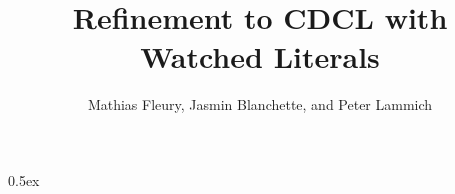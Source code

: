 \documentclass[11pt,a4paper]{book}
\begin{document}
\title{Refinement to CDCL with Watched Literals}
\author{Mathias Fleury, Jasmin Blanchette, and Peter Lammich}
\maketitle

\tableofcontents

\parindent 0pt\parskip 0.5ex



%
%
\end{document}
